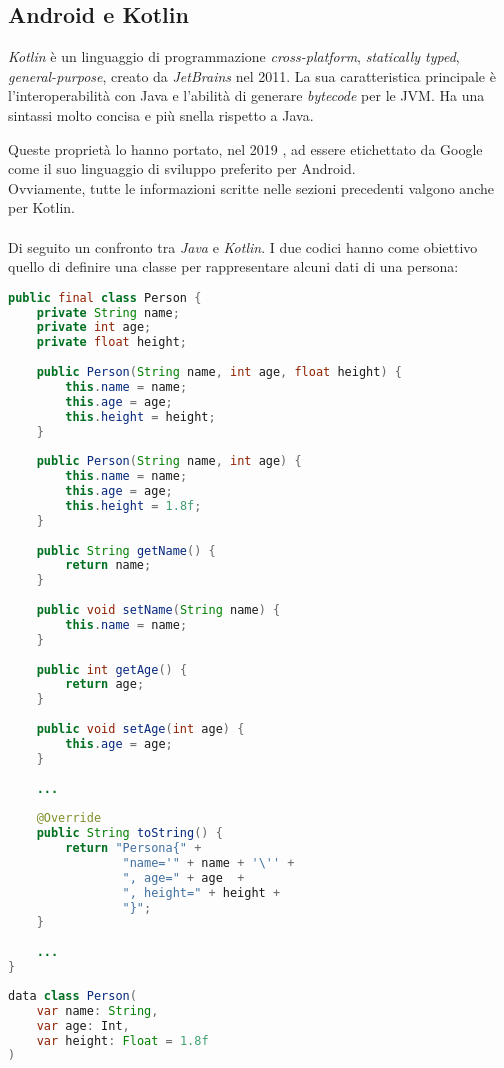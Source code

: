 \subsection{Android e Kotlin}   %
\textit{Kotlin} è un linguaggio di programmazione \textit{cross-platform}, \textit{statically typed}, \textit{general-purpose}, creato da \textit{JetBrains} nel 2011. La sua caratteristica principale è l'interoperabilità con Java e l'abilità di generare \textit{bytecode} per le JVM. Ha una sintassi molto concisa e più snella rispetto a Java.

Queste proprietà lo hanno portato, nel 2019 \cite{kotlin}, ad essere etichettato da Google come il suo linguaggio di sviluppo preferito per Android.\\
Ovviamente, tutte le informazioni scritte nelle sezioni precedenti valgono anche per Kotlin.\\
\\
Di seguito un confronto tra \textit{Java} e \textit{Kotlin}. I due codici hanno come obiettivo quello di definire una classe per rappresentare alcuni dati di una persona:\\

\begin{lstlisting}[language=Java, caption=Esempio di codice Java]
public final class Person {
    private String name;
    private int age;
    private float height;
    
    public Person(String name, int age, float height) {
        this.name = name;
        this.age = age;
        this.height = height;
    }
    
    public Person(String name, int age) {
        this.name = name;
        this.age = age;
        this.height = 1.8f;
    }
    
    public String getName() {
        return name;
    }
    
    public void setName(String name) {
        this.name = name;
    }
    
    public int getAge() {
        return age;
    }
    
    public void setAge(int age) {
        this.age = age;
    }
    
    ...
    
    @Override
    public String toString() {
        return "Persona{" +
                "name='" + name + '\'' +
                ", age=" + age  +
                ", height=" + height +
                "}";
    }
    
    ...
}
\end{lstlisting} 

\begin{lstlisting}[language=Java, caption=Esempio di codice Kotlin]
data class Person(
    var name: String, 
    var age: Int, 
    var height: Float = 1.8f
)
\end{lstlisting}

